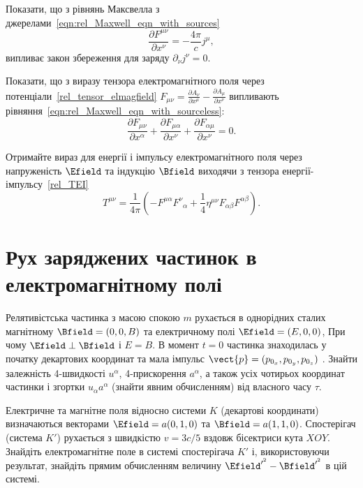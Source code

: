 \begin{problem}
Показати, що з рівнянь Максвелла з джерелами~\eqref{eqn:rel_Maxwell_eqn_with_sources}
\[
	\frac{\partial F^{\mu\nu}}{\partial x^\nu} = -\frac{4\pi}{c}j^\mu,
\]
випливає закон збереження для заряду $\partial_\nu j^{\nu} = 0$.
\end{problem}

\begin{problem}
Показати, що з виразу тензора електромагнітного поля через потенціали~\eqref{rel_tensor_elmagfield} $F_{\mu\nu} = \frac{\partial A_\nu}{\partial  x^\mu} - \frac{\partial A_\mu}{\partial  x^\nu}$ випливають рівняння~\eqref{eqn:rel_Maxwell_eqn_with_sourceless}:
\[
    \frac{\partial F_{\mu\nu}}{\partial x^\alpha} + \frac{\partial F_{\mu\alpha}}{\partial x^\nu} +\frac{\partial F_{\alpha\mu}}{\partial x^\nu}  = 0.
\]
\end{problem}


\begin{problem}
Отримайте вираз для енергії і імпульсу електромагнітного поля через напруженість $\Efield$ та індукцію $\Bfield$ виходячи з тензора енергії-імпульсу~\eqref{rel_TEI}
\[
	T^{\mu\nu} = \frac{1}{4\pi}\left( -F^{\mu \alpha}F^\nu_{\;\;\alpha} + \frac14\eta^{\mu\nu}F_{\alpha\beta}F^{\alpha\beta}\right).
\]
\end{problem}

\section{Рух заряджених частинок в електромагнітному полі}

\begin{problem}
Релятивістська частинка з масою спокою $m$ рухається в однорідних сталих  магнітному  $\Bfield = (0,0,B)$ та електричному полі $\Efield = (E,0,0)$, При чому $\Efield\perp\Bfield$  і $E = B$. В момент $t=0$ частинка знаходилась у початку декартових координат та мала імпульс $\vect{p} = (p_{0_x}, p_{0_y}, p_{0_z})$ . Знайти залежність 4-швидкості $u^{\alpha}$, 4-прискорення $a^{\alpha}$, а також усіх чотирьох координат частинки і згортки $u_{\alpha}a^{\alpha}$  (знайти явним обчисленням) від власного часу $\tau$.
\end{problem}

\begin{problem}
Електричне та магнітне поля відносно системи $K$ (декартові координати) визначаються векторами $\Efield = a(0,1,0)$ та $\Bfield = a(1,1,0)$. Спостерігач (система $K'$) рухається з швидкістю $v=3c/5$ вздовж бісектриси кута $XOY$. Знайдіть електромагнітне поле в системі спостерігача $K'$ і, використовуючи результат, знайдіть прямим обчисленням величину $\Efield^{\prime^2} - \Bfield^{\prime^2}$  в цій системі.
\end{problem}

